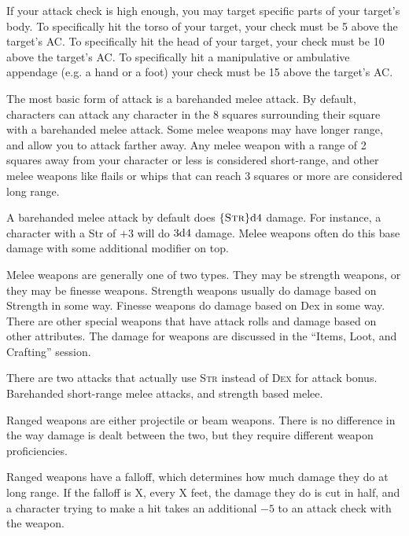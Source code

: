 If your attack check is high enough, you may target specific parts of your target's body. To specifically hit the torso of your target, your check must be 5 above the target's AC. To specifically hit the head of your target, your check must be 10 above the target's AC. To specifically hit a manipulative or ambulative appendage (e.g. a hand or a foot) your check must be 15 above the target's AC.

The most basic form of attack is a barehanded melee attack. By default, characters can attack any character in the 8 squares surrounding their square with a barehanded melee attack. Some melee weapons may have longer range, and allow you to attack farther away. Any melee weapon with a range of 2 squares away from your character or less is considered short-range, and other melee weapons like flails or whips that can reach 3 squares or more are considered long range.

A barehanded melee attack by default does $\{ \textsc{Str} \}\mathrm{d}4$ damage. For instance, a character with a Str of $+3$ will do $3\mathrm{d}4$ damage. Melee weapons often do this base damage with some additional modifier on top.

Melee weapons are generally one of two types. They may be strength weapons, or they may be finesse weapons. Strength weapons usually do damage based on Strength in some way. Finesse weapons do damage based on Dex in some way. There are other special weapons that have attack rolls and damage based on other attributes. The damage for weapons are discussed in the “Items, Loot, and Crafting” session.

There are two attacks that actually use \textsc{Str} instead of \textsc{Dex} for attack bonus. Barehanded short-range melee attacks, and strength based melee.

Ranged weapons are either projectile or beam weapons. There is no difference in the way damage is dealt between the two, but they require different weapon proficiencies.

Ranged weapons have a falloff, which determines how much damage they do at long range. If the falloff is X, every X feet, the damage they do is cut in half, and a character trying to make a hit takes an additional $-5$ to an attack check with the weapon.


